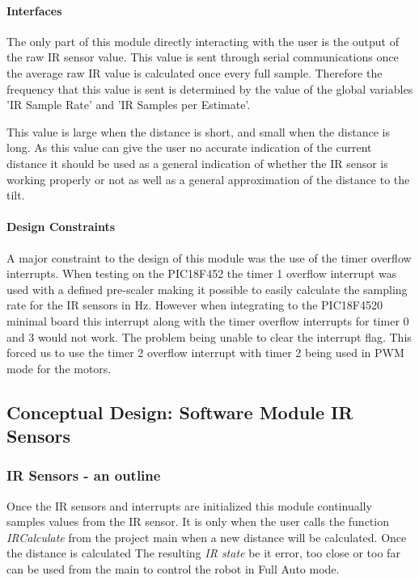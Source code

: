 \documentclass[MTRX3700report.tex]{subfiles}
\begin{document}
\paragraph{Interfaces}

The only part of this module directly interacting with the user is the output of the raw IR sensor value. This value is sent through serial communications once the average raw IR value is calculated once every full sample. Therefore the frequency that this value is sent is determined by the value of the global variables 'IR Sample Rate' and 'IR Samples per Estimate'. 

This value is large when the distance is short, and small when the distance is long. As this value can give the user no accurate indication of the current distance it should be used as a general indication of whether the IR sensor is working properly or not as well as a general approximation of the distance to the tilt.
 
\paragraph{Design Constraints}
A major constraint to the design of this module was the use of the timer overflow interrupts. When testing on the PIC18F452 the timer 1 overflow interrupt was used with a defined pre-scaler making it possible to easily calculate the sampling rate for the IR sensors in Hz. However when integrating to the PIC18F4520 minimal board this interrupt along with the timer overflow interrupts for timer 0 and 3 would not work. The problem being unable to clear the interrupt flag. This forced us to use the timer 2 overflow interrupt with timer 2 being used in PWM mode for the motors.   

\subsection{Conceptual Design: Software Module IR Sensors}


\subsubsection{IR Sensors - an outline}
Once the IR sensors and interrupts are initialized this module continually samples values from the IR sensor. It is only when the user calls the function \textit{IR\textunderscore  Calculate} from the project main when a new distance will be calculated. Once the distance is calculated The resulting \textit{IR state} be it error, too close or too far can be used from the main to control the robot in Full Auto mode.
\end{document}
